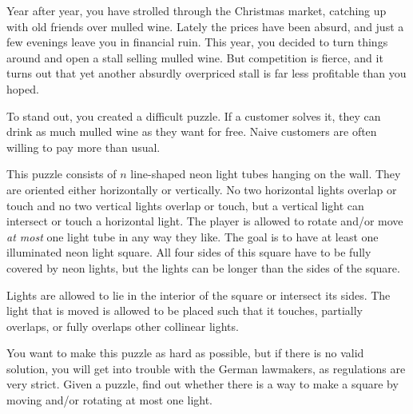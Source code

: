 






Year after year, you have strolled through the Christmas market, catching up with old friends over mulled wine.
Lately the prices have been absurd, and just a few evenings leave you in financial ruin.
This year, you decided to turn things around and open a stall selling mulled wine.
But competition is fierce, and it turns out that yet another absurdly overpriced stall is far less profitable than you hoped.

To stand out, you created a difficult puzzle.
If a customer solves it, they can drink as much mulled wine as they want for free.
Naive customers are often willing to pay more than usual.

This puzzle consists of $n$ line-shaped neon light tubes hanging on the wall.
They are oriented either horizontally or vertically.
No two horizontal lights overlap or touch and no two vertical lights overlap or touch, but a vertical light can intersect or touch a horizontal light.
The player is allowed to rotate and/or move \emph{at most} one light tube in any way they like.
The goal is to have at least one illuminated neon light square.
All four sides of this square have to be fully covered by neon lights, but the lights can be longer than the sides of the square.

Lights are allowed to lie in the interior of the square or intersect its sides.
The light that is moved is allowed to be placed such that it touches,
partially overlaps, or fully overlaps other collinear lights.

You want to make this puzzle as hard as possible, but if there is no valid solution, you will get into trouble with the German lawmakers, as regulations are very strict.
Given a puzzle, find out whether there is a way to make a square by moving and/or rotating at most one light.

